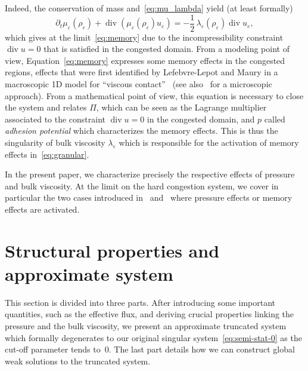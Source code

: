 \documentclass[JEP,XML,SOM,Unicode,NoEqCountersInSection]{cedram}
\newcommand{\<}{\bigl\langle}
\renewcommand{\>}{\bigr\rangle}
\theoremstyle{definition}
\theoremstyle{remark}
\DeclareMathOperator{\Div}{div}
\let\ep\varepsilon
\begin{document}
Indeed, the conservation of mass and~\eqref{eq:mu_lambda} yield (at least formally)
\[
\partial_t \mu_\ep(\rho_\ep) + \Div(\mu_\ep(\rho_\ep) u_\ep) = - \dfrac{1}{2}\,\lambda_\ep(\rho_\ep)\Div u_\ep,
\]
which gives at the limit~\eqref{eq:memory} due to the incompressibility constraint $\Div u = 0$ that is satisfied in the congested domain.
From a modeling point of view, Equation~\eqref{eq:memory} expresses some memory effects in the congested regions, effects that were first identified by {Lefebvre-Lepot} and {Maury} in a macroscopic 1D model for ``viscous contact''~\cite{lefebvre2011} (see also~\cite{lefebvre2009} for a microscopic approach).
From a mathematical point of view, this equation is necessary to close the system and relates $\Pi$, which can be seen as the Lagrange multiplier associated to the constraint $\Div u = 0$ in the congested domain, and $p$ called \emph{adhesion potential} which characterizes the memory effects.
This is thus the singularity of bulk viscosity $\lambda_\ep$ which is responsible for the activation of memory effects in~\eqref{eq:granular}.

In the present paper, we characterize precisely the respective effects of pressure and bulk viscosity.
At the limit on the hard congestion system, we cover in particular the two cases introduced in~\cite{peza2015} and~\cite{perrin2017} where pressure effects or memory effects are activated.

\section{Structural properties and approximate system}

This section is divided into three parts.
After introducing some important quantities, such as the effective flux, and deriving crucial properties linking the pressure and the bulk viscosity, we present an approximate truncated system which formally degenerates to our original singular system~\eqref{eq:semi-stat-0} as the cut-off parameter tends to~$0$.
The last part details how we can construct global weak solutions to the truncated system.
\end{document}

